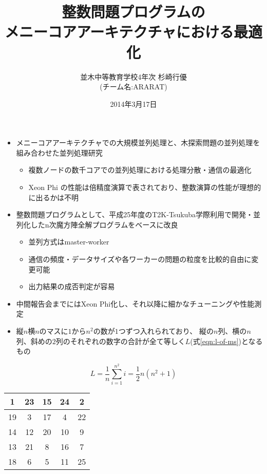 \documentclass[headrule,footrule,landscape,a4paper,25pt]{foils}
\title{整数問題プログラムの \\ メニーコアアーキテクチャにおける最適化}
\date{2014年3月17日}
\author{並木中等教育学校4年次 杉崎行優 \\ (チーム名:ARARAT)}
\begin{document}
\MyLogo{}
\maketitle

 \begin{itemize}
  \item メニーコアアーキテクチャでの大規模並列処理と、木探索問題の並列処理を組み合わせた並列処理研究
  \begin{itemize}
   \item 複数ノードの数千コアでの並列処理における処理分散・通信の最適化
   \item Xeon Phi の性能は倍精度演算で表されており、整数演算の性能が理想的に出るかは不明
  \end{itemize}
 \end{itemize}

 \begin{itemize}
  \item 整数問題プログラムとして、平成25年度のT2K-Tsukuba学際利用で開発・並列化したn次魔方陣全解プログラムをベースに改良
  \begin{itemize}
   \item 並列方式はmaster-worker
   \item 通信の頻度・データサイズや各ワーカーの問題の粒度を比較的自由に変更可能
   \item 出力結果の成否判定が容易
  \end{itemize}
  \item 中間報告会までにはXeon Phi化し、それ以降に細かなチューニングや性能測定
 \end{itemize}

 \begin{itemize}
  \item 縦$n$横$n$のマスに$1$から$n^2$の数が$1$つずつ入れられており、
        縦の$n$列、横の$n$列、斜めの$2$列のそれぞれの数字の合計が全て等しく$L$(式\ref{eqn:l-of-ms})となるもの
 \end{itemize}
 \begin{equation} \label{eqn:l-of-ms}
  L=\frac{1}{n} \sum_{i=1}^{n^2}i = \frac{1}{2} n(n^2+1)
 \end{equation}

 {\Large
  \begin{center}
   \begin{tabular}{|c|c|c|c|c|}
    \hline
    1 & 23 & 15 & 24 & 2 \\\hline
    19 & 3 & 17 & 4 & 22 \\\hline
    14 & 12 & 20 & 10 & 9 \\\hline
    13 & 21 & 8 & 16 & 7 \\\hline
    18 & 6 & 5 & 11 & 25 \\\hline
   \end{tabular}
  \end{center}
 }
\end{document}
